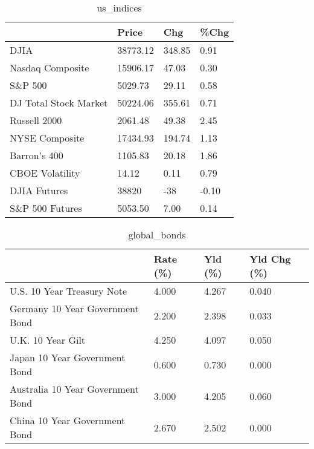 \documentclass{article}%
\begin{document}
%


\begin{table}[htbp]%
\caption{us\_indices}%
\centering%
\begin{adjustbox}{width=1\textwidth}%
\begin{tabular}{llll}
\toprule
                      &    Price &    Chg &  \%Chg \\
\midrule
                 DJIA & 38773.12 & 348.85 &  0.91 \\
     Nasdaq Composite & 15906.17 &  47.03 &  0.30 \\
              S\&P 500 &  5029.73 &  29.11 &  0.58 \\
DJ Total Stock Market & 50224.06 & 355.61 &  0.71 \\
         Russell 2000 &  2061.48 &  49.38 &  2.45 \\
       NYSE Composite & 17434.93 & 194.74 &  1.13 \\
         Barron's 400 &  1105.83 &  20.18 &  1.86 \\
      CBOE Volatility &    14.12 &   0.11 &  0.79 \\
         DJIA Futures &    38820 &    -38 & -0.10 \\
      S\&P 500 Futures &  5053.50 &   7.00 &  0.14 \\
\bottomrule
\end{tabular}
%
\end{adjustbox}%
\end{table}

%


\begin{table}[htbp]%
\caption{global\_bonds}%
\centering%
\begin{adjustbox}{width=1\textwidth}%
\begin{tabular}{llll}
\toprule
                                  & Rate (\%) & Yld (\%) & Yld Chg (\%) \\
\midrule
       U.S. 10 Year Treasury Note &    4.000 &   4.267 &       0.040 \\
  Germany 10 Year Government Bond &    2.200 &   2.398 &       0.033 \\
                U.K. 10 Year Gilt &    4.250 &   4.097 &       0.050 \\
    Japan 10 Year Government Bond &    0.600 &   0.730 &       0.000 \\
Australia 10 Year Government Bond &    3.000 &   4.205 &       0.060 \\
    China 10 Year Government Bond &    2.670 &   2.502 &       0.000 \\
\bottomrule
\end{tabular}
%
\end{adjustbox}%
\end{table}
\end{document}
